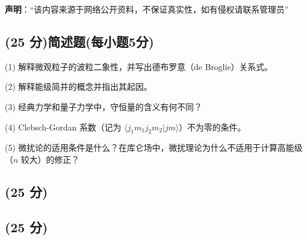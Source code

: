
\textbf{声明}：“该内容来源于网络公开资料，不保证真实性，如有侵权请联系管理员”

\subsection{(25 分)简述题(每小题5分)}
(1) 解释微观粒子的波粒二象性，并写出德布罗意（de Broglie）关系式。

(2) 解释能级简并的概念并指出其起因。

(3) 经典力学和量子力学中，守恒量的含义有何不同？

(4) Clebsch-Gordan 系数（记为 $\langle  j_1 m_1 j_2 m_2|j m  \rangle$）不为零的条件。

(5) 微扰论的适用条件是什么？在库仑场中，微扰理论为什么不适用于计算高能级（$n$ 较大）的修正？

\subsection{(25 分)}

\subsection{(25 分)}